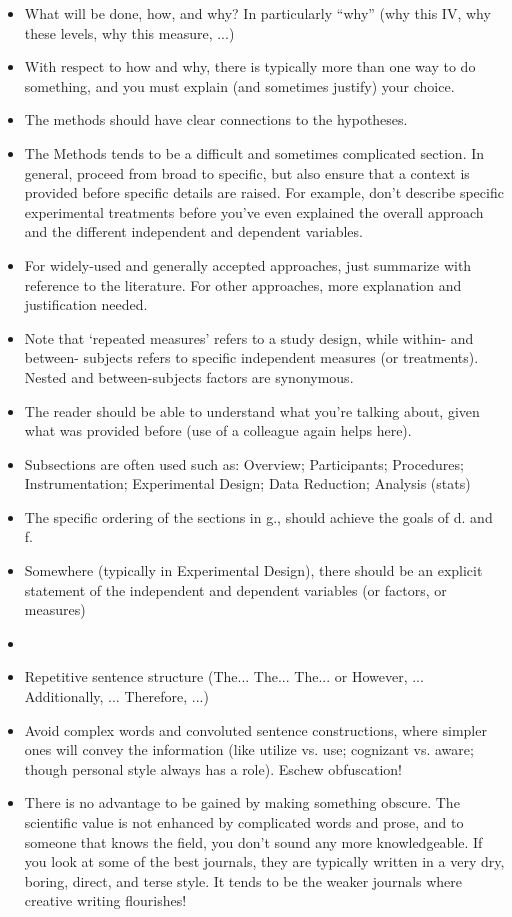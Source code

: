 \begin{itemize}
  \item What will be done, how, and why? In particularly “why” (why this IV, why these levels, why
  this measure, ...)
  \item With respect to how and why, there is typically more than one way to do something, and you
  must explain (and sometimes justify) your choice.
  \item The methods should have clear connections to the hypotheses.
  \item The Methods tends to be a difficult and sometimes complicated section. In general, proceed
  from broad to specific, but also ensure that a context is provided before specific details are
  raised. For example, don’t describe specific experimental treatments before you’ve even explained
  the overall approach and the different independent and dependent variables.
  \item For widely-used and generally accepted approaches, just summarize with reference to the
  literature. For other approaches, more explanation and justification needed.
  \item Note that ‘repeated measures’ refers to a study design, while within- and between- subjects
  refers to specific independent measures (or treatments). Nested and between-subjects factors are 
  synonymous.
  \item The reader should be able to understand what you’re talking about, given what was provided
  before (use of a colleague again helps here).
  \item Subsections are often used such as: Overview; Participants; Procedures; Instrumentation;
  Experimental Design; Data Reduction; Analysis (stats)
  \item The specific ordering of the sections in g., should achieve the goals of d. and f.
  \item Somewhere (typically in Experimental Design), there should be an explicit statement of the
  independent and dependent variables (or factors, or measures)
  \item 
\end{itemize}

\begin{itemize}
  \item Repetitive sentence structure (The... The... The... or However, ... Additionally, ...
  Therefore, ...)
  \item Avoid complex words and convoluted sentence constructions, where simpler ones will convey
  the information (like utilize vs. use; cognizant vs. aware; though personal style always has a role). 
  Eschew obfuscation!
  \item There is no advantage to be gained by making something obscure. The scientific value is not
  enhanced by complicated words and prose, and to someone that knows the field, you don’t sound any
  more knowledgeable. If you look at some of the best journals, they are typically written in a very 
  dry, boring, direct, and terse style. It tends to be the weaker journals where creative writing 
  flourishes! 
\end{itemize}

